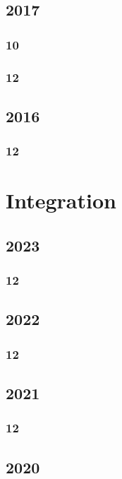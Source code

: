 \documentclass[11pt]{book}
\begin{document}
\section{2017}
\subsection{10}

\subsection{12}


\section{2016}
\subsection{12}









\chapter{Integration}
\section{2023}
\subsection{12}

\section{2022}
\subsection{12}


\section{2021}
\subsection{12}

\section{2020}
\end{document}
